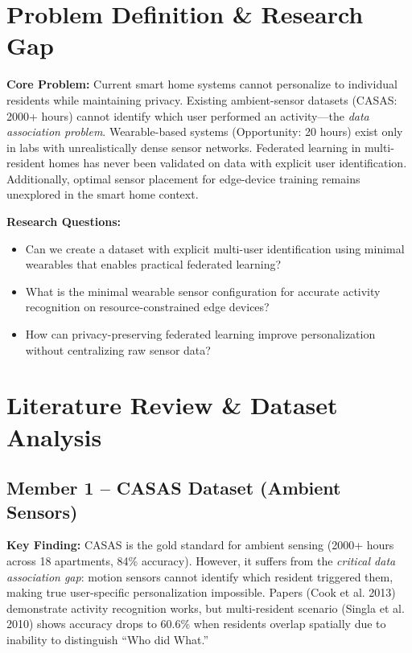 \documentclass[11pt, a4paper]{article}
\begin{document}

\section{Problem Definition \& Research Gap}

\textbf{Core Problem:} Current smart home systems cannot personalize to individual residents while maintaining privacy. Existing ambient-sensor datasets (CASAS: 2000+ hours) cannot identify which user performed an activity---the \textit{data association problem}. Wearable-based systems (Opportunity: 20 hours) exist only in labs with unrealistically dense sensor networks. Federated learning in multi-resident homes has never been validated on data with explicit user identification. Additionally, optimal sensor placement for edge-device training remains unexplored in the smart home context.

\textbf{Research Questions:}
\begin{itemize}[noitemsep, topsep=0pt, leftmargin=*]
    \item Can we create a dataset with explicit multi-user identification using minimal wearables that enables practical federated learning?
    \item What is the minimal wearable sensor configuration for accurate activity recognition on resource-constrained edge devices?
    \item How can privacy-preserving federated learning improve personalization without centralizing raw sensor data?
\end{itemize}

\section{Literature Review \& Dataset Analysis}

\subsection{Member 1 -- CASAS Dataset (Ambient Sensors)}

\textbf{Key Finding:} CASAS is the gold standard for ambient sensing (2000+ hours across 18 apartments, 84\% accuracy). However, it suffers from the \textit{critical data association gap}: motion sensors cannot identify which resident triggered them, making true user-specific personalization impossible. Papers (Cook et al. 2013) demonstrate activity recognition works, but multi-resident scenario (Singla et al. 2010) shows accuracy drops to 60.6\% when residents overlap spatially due to inability to distinguish ``Who did What.''
\end{document}
